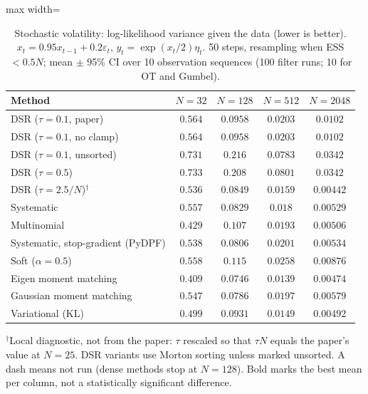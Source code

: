 \begin{table}[H]
\centering
\small
\caption{Stochastic volatility: log-likelihood variance given the data (lower is better). $x_t=0.95x_{t-1}+0.2\varepsilon_t$, $y_t=\exp(x_t/2)\eta_t$. 50 steps, resampling when ESS $<0.5N$; mean $\pm$ 95\% CI over 10 observation sequences (100 filter runs; 10 for OT and Gumbel).}
\label{tab:volatility-conditional_loglik_variance}
\begin{adjustbox}{max width=\linewidth}
\begin{tabular}{lcccc}
\toprule
Method & $N{=}32$ & $N{=}128$ & $N{=}512$ & $N{=}2048$ \\
\midrule
DSR ($\tau{=}0.1$, paper) & $0.564$ & $0.0958$ & $0.0203$ & $0.0102$ \\
DSR ($\tau{=}0.1$, no clamp) & $0.564$ & $0.0958$ & $0.0203$ & $0.0102$ \\
DSR ($\tau{=}0.1$, unsorted) & $0.731$ & $0.216$ & $0.0783$ & $0.0342$ \\
DSR ($\tau{=}0.5$) & $0.733$ & $0.208$ & $0.0801$ & $0.0342$ \\
DSR ($\tau{=}2.5/N$)$^\dagger$ & $0.536$ & $0.0849$ & $0.0159$ & $\mathbf{0.00442}$ \\
\midrule
Systematic & $0.557$ & $0.0829$ & $0.018$ & $0.00529$ \\
Multinomial & $0.429$ & $0.107$ & $0.0193$ & $0.00506$ \\
Systematic, stop-gradient (PyDPF) & $0.538$ & $0.0806$ & $0.0201$ & $0.00534$ \\
Soft ($\alpha{=}0.5$) & $0.558$ & $0.115$ & $0.0258$ & $0.00876$ \\
Eigen moment matching & $\mathbf{0.409}$ & $\mathbf{0.0746}$ & $\mathbf{0.0139}$ & $0.00474$ \\
Gaussian moment matching & $0.547$ & $0.0786$ & $0.0197$ & $0.00579$ \\
Variational (KL) & $0.499$ & $0.0931$ & $0.0149$ & $0.00492$ \\
\bottomrule
\end{tabular}
\end{adjustbox}
\par\smallskip\parbox{0.95\linewidth}{\footnotesize $^\dagger$Local diagnostic, not from the paper: $\tau$ rescaled so that $\tau N$ equals the paper's value at $N{=}25$. DSR variants use Morton sorting unless marked unsorted. A dash means not run (dense methods stop at $N{=}128$). Bold marks the best mean per column, not a statistically significant difference.}
\end{table}

